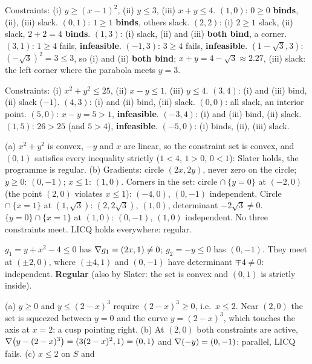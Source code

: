\begin{solutions}
  \item Constraints: (i) $y\ge(x-1)^{2}$, (ii) $y\le3$, (iii) $x+y\le4$.
        $(1,0)$: $0\ge0$ \textbf{binds}, (ii), (iii) slack. $(0,1)$:
        $1\ge1$ \textbf{binds}, others slack. $(2,2)$: (i) $2\ge1$ slack,
        (ii) slack, $2+2=4$ \textbf{binds}. $(1,3)$: (i) slack, (ii) and
        (iii) \textbf{both bind}, a corner. $(3,1)$: $1\ge4$ fails,
        \textbf{infeasible}. $(-1,3)$: $3\ge4$ fails, \textbf{infeasible}.
        $(1-\sqrt3,3)$: $(-\sqrt3)^{2}=3\le3$, so (i) and (ii) \textbf{both
        bind}; $x+y=4-\sqrt3\approx2.27$, (iii) slack: the left corner where
        the parabola meets $y=3$.
  \item Constraints: (i) $x^{2}+y^{2}\le25$, (ii) $x-y\le1$, (iii)
        $y\le4$. $(3,4)$: (i) and (iii) bind, (ii) slack ($-1$). $(4,3)$:
        (i) and (ii) bind, (iii) slack. $(0,0)$: all slack, an interior
        point. $(5,0)$: $x-y=5>1$, \textbf{infeasible}. $(-3,4)$: (i) and
        (iii) bind, (ii) slack. $(1,5)$: $26>25$ (and $5>4$),
        \textbf{infeasible}. $(-5,0)$: (i) binds, (ii), (iii) slack.
  \item (a) $x^{2}+y^{2}$ is convex, $-y$ and $x$ are linear, so the
        constraint set is convex, and $(0,1)$ satisfies every inequality
        strictly ($1<4$, $1>0$, $0<1$): Slater holds, the programme is
        regular. (b) Gradients: circle $(2x,2y)$, never zero on the circle;
        $y\ge0$: $(0,-1)$; $x\le1$: $(1,0)$. Corners in the set:
        circle $\cap\ \{y=0\}$ at $(-2,0)$ (the point $(2,0)$ violates
        $x\le1$): $(-4,0)$, $(0,-1)$ independent. Circle $\cap\ \{x=1\}$ at
        $(1,\sqrt3)$: $(2,2\sqrt3)$, $(1,0)$, determinant $-2\sqrt3\neq0$.
        $\{y=0\}\cap\{x=1\}$ at $(1,0)$: $(0,-1)$, $(1,0)$ independent. No
        three constraints meet. LICQ holds everywhere: regular.
  \item $g_1=y+x^{2}-4\le0$ has $\nabla g_1=(2x,1)\neq0$; $g_2=-y\le0$ has
        $(0,-1)$. They meet at $(\pm2,0)$, where $(\pm4,1)$ and $(0,-1)$ have
        determinant $\mp4\neq0$: independent. \textbf{Regular} (also by
        Slater: the set is convex and $(0,1)$ is strictly inside).
  \item (a) $y\ge0$ and $y\le(2-x)^{3}$ require $(2-x)^{3}\ge0$, i.e.\
        $x\le2$. Near $(2,0)$ the set is squeezed between $y=0$ and the curve
        $y=(2-x)^{3}$, which touches the axis at $x=2$: a cusp pointing
        right. (b) At $(2,0)$ both constraints are active,
        $\nabla\bigl(y-(2-x)^{3}\bigr)=(3(2-x)^{2},1)=(0,1)$ and
        $\nabla(-y)=(0,-1)$: parallel, LICQ fails. (c) $x\le2$ on $S$ and

\end{solutions}
